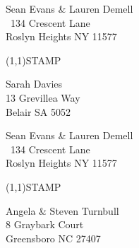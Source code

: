 \documentclass[12pt]{article}
\begin{document}
\clearpage

\begin{minipage}{.5\linewidth} \noindent
Sean Evans \& Lauren Demell\\\ 
134 Crescent Lane\\ 
Roslyn Heights NY 11577
\end{minipage}
\begin{minipage}{.5\linewidth \hspace{-.2in} \vspace{-.3in}}
\begin{flushright}
\framebox(1,1){STAMP}
\end{flushright}
\end{minipage}

\begin{center} \begin{Huge} \vspace*{\fill}
Sarah Davies\\
13 Grevillea Way\\
Belair SA 5052\\
\vspace{\fill} \end{Huge} \end{center}

\clearpage

\begin{minipage}{.5\linewidth} \noindent
Sean Evans \& Lauren Demell\\\ 
134 Crescent Lane\\ 
Roslyn Heights NY 11577
\end{minipage}
\begin{minipage}{.5\linewidth \hspace{-.2in} \vspace{-.3in}}
\begin{flushright}
\framebox(1,1){STAMP}
\end{flushright}
\end{minipage}

\begin{center} \begin{Huge} \vspace*{\fill}
Angela \& Steven Turnbull\\
8 Graybark Court\\
Greensboro NC 27407\\
\vspace{\fill} \end{Huge} \end{center}
\end{document}

